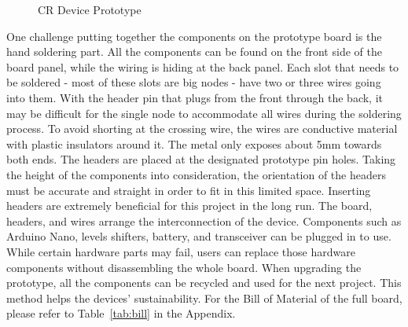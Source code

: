 \begin{figure}[ht]
    \centering
    \qquad
    \caption{CR Device Prototype}%
    \label{fig:prototype_front_back_view}%
\end{figure}

One challenge putting together the components on the prototype board is the hand soldering part. All the components can be found on the front side of the board panel, while the wiring is hiding at the back panel. Each slot that needs to be soldered - most of these slots are big nodes - have two or three wires going into them. With the header pin that plugs from the front through the back, it may be  difficult for the single node to accommodate all wires during the soldering process. To avoid shorting at the crossing wire, the wires are conductive material with plastic insulators around it. The metal only exposes about 5mm towards both ends. The headers are placed at the designated prototype pin holes. Taking the height of the components into consideration, the orientation of the headers must be accurate and straight in order to fit in this limited space. Inserting headers are extremely beneficial for this project in the long run. The board, headers, and wires arrange the interconnection of the device. Components such as Arduino Nano, levels shifters, battery, and transceiver can be plugged in to use. While certain hardware parts may fail, users can replace those hardware components without disassembling the whole board. When upgrading the prototype, all the components can be recycled and used for the next project. This method helps the devices' sustainability. For the Bill of Material of the full board, please refer to Table~\ref{tab:bill} in the Appendix.


